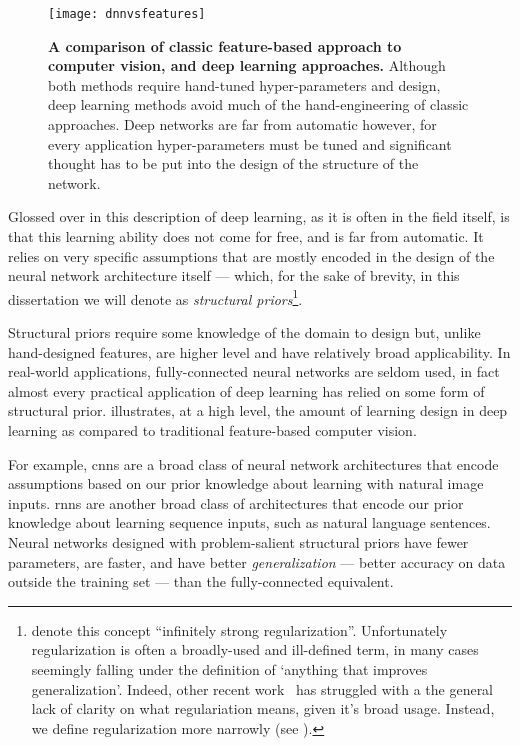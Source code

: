 \documentclass[thesis]{subfiles}
\begin{document}
\begin{figure}[tbp]
	\centering
	\texttt{[image: dnnvsfeatures]}
	\caption[Classic feature-based approach \vs{}deep learning]{\textbf{A comparison of classic feature-based approach to computer vision, and deep learning approaches.} Although both methods require hand-tuned hyper-parameters and design, deep learning methods avoid much of the hand-engineering of classic approaches. Deep networks are far from automatic however, for every application hyper-parameters must be tuned and significant thought has to be put into the design of the structure of the network.}\label{dnnvsfeatures}
\end{figure}
	
Glossed over in this description of deep learning, as it is often in the field itself, is that this learning ability does not come for free, and is far from automatic. It relies on very specific assumptions that are mostly encoded in the design of the neural network architecture itself --- which, for the sake of brevity, in this dissertation we will denote as \emph{structural priors}\footnote{\citet{goodfellow2016deep} denote this concept ``infinitely strong regularization''. Unfortunately regularization is often a broadly-used and ill-defined term, in many cases seemingly falling under the definition of `anything that improves generalization'. Indeed, other recent work~\citep{rethinking2016} has struggled with a the general lack of clarity on what regulariation means, given it's broad usage. Instead, we define \gls{regularization} more narrowly (see ). }.

Structural priors require some knowledge of the domain to design but, unlike hand-designed features, are higher level and have relatively broad applicability. In real-world applications, fully-connected neural networks are seldom used, in fact almost every practical application of deep learning has relied on some form of structural prior.  illustrates, at a high level, the amount of learning \vs{}design in deep learning as compared to traditional feature-based computer vision.

For example, \glspl{cnn} are a broad class of neural network architectures that encode assumptions based on our prior knowledge about learning with natural image inputs. \Glspl{rnn} are another broad class of architectures that encode our prior knowledge about learning sequence inputs, such as natural language sentences. Neural networks designed with problem-salient structural priors have fewer parameters, are faster, and have better \emph{generalization} --- better accuracy on data outside the training set --- than the fully-connected equivalent.
\end{document}
